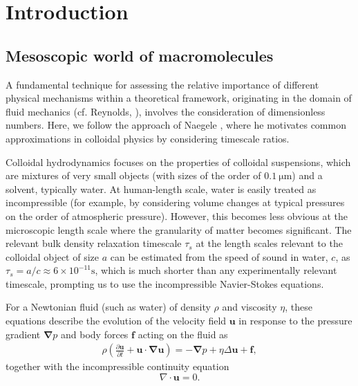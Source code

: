 \documentclass[physics]{doctoral}
\newcommand{\pd}{\partial}
\begin{document}
\chapter{Introduction}

\section{Mesoscopic world of macromolecules}

A fundamental technique for assessing the relative importance of different physical mechanisms within a theoretical framework, originating in the domain of fluid mechanics (cf.
Reynolds, \cite{Reynolds_1883}), involves the consideration of dimensionless numbers.
Here, we follow the approach of Naegele \cite{Nagele_2013}, where he motivates common approximations in colloidal physics by considering timescale ratios.

Colloidal hydrodynamics focuses on the properties of colloidal suspensions, which are mixtures of very small objects (with sizes of the order of $0.1\ \mathrm{\mu m}$) and a solvent, typically water.
At human-length scale, water is easily treated as incompressible (for example, by considering volume changes at typical pressures on the order of atmospheric pressure).
However, this becomes less obvious at the microscopic length scale where the granularity of matter becomes significant.
The relevant bulk density relaxation timescale $\tau_s$ at the length scales relevant to the colloidal object of size $a$ can be estimated from the speed of sound in water, $c$, as $\tau_s = a/c \approx 6 \times 10^{-11} \mathrm{s}$, which is much shorter than any experimentally relevant timescale, prompting us to use the incompressible Navier-Stokes equations.

For a Newtonian fluid (such as water) of density $\rho$ and viscosity $\eta$, these equations describe the evolution of the velocity field $\bm{u}$ in response to the pressure gradient $\bm{\nabla} p$ and body forces $\bm{f}$ acting on the fluid as
\begin{eqnarray}
    \rho \left( \frac{\pd \bm{u}}{\pd t} + \bm{u} \cdot \bm{\nabla u} \right) = - \bm{\nabla} p + \eta \Delta \bm{u} + \bm{f}, \label{eqn:navier-stokes-equation}
\end{eqnarray}
together with the incompressible continuity equation
\begin{equation}
    \nabla \cdot \bm{u} = 0 \label{eqn:incompressibility}.
\end{equation}
\end{document}
